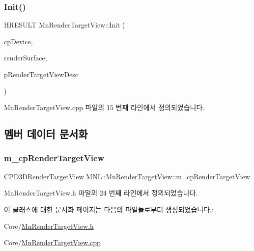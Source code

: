 \subsubsection{\texorpdfstring{Init()}{Init()}}
{\footnotesize\ttfamily H\+R\+E\+S\+U\+LT Mn\+Render\+Target\+View\+::\+Init (\begin{DoxyParamCaption}\item[{const \hyperlink{namespace_m_n_l_a1eec210db8f309a4a9ac0d9658784c31}{C\+P\+D3\+D\+Device}}]{cp\+Device,  }\item[{const \hyperlink{namespace_m_n_l_addb538e1cbd1f443e6db5e6312487c51}{C\+P\+D3\+D\+Texture2D}}]{render\+Surface,  }\item[{const std\+::shared\+\_\+ptr$<$ D3\+D11\+\_\+\+R\+E\+N\+D\+E\+R\+\_\+\+T\+A\+R\+G\+E\+T\+\_\+\+V\+I\+E\+W\+\_\+\+D\+E\+SC $>$}]{p\+Render\+Target\+View\+Desc }\end{DoxyParamCaption})}



Mn\+Render\+Target\+View.\+cpp 파일의 15 번째 라인에서 정의되었습니다.



\subsection{멤버 데이터 문서화}
\mbox{\label{class_m_n_l_1_1_mn_render_target_view_ab9446c83ebcb3bd16d6ae02cd2692a11}} 
\subsubsection{\texorpdfstring{m\+\_\+cp\+Render\+Target\+View}{m\_cpRenderTargetView}}
{\footnotesize\ttfamily \hyperlink{namespace_m_n_l_aa08a7c0b5ac9d877dacb57b9306b7b8c}{C\+P\+D3\+D\+Render\+Target\+View} M\+N\+L\+::\+Mn\+Render\+Target\+View\+::m\+\_\+cp\+Render\+Target\+View\hspace{0.3cm}{\ttfamily [private]}}



Mn\+Render\+Target\+View.\+h 파일의 24 번째 라인에서 정의되었습니다.



이 클래스에 대한 문서화 페이지는 다음의 파일들로부터 생성되었습니다.\+:\begin{DoxyCompactItemize}
\item 
Core/\hyperlink{_mn_render_target_view_8h}{Mn\+Render\+Target\+View.\+h}\item 
Core/\hyperlink{_mn_render_target_view_8cpp}{Mn\+Render\+Target\+View.\+cpp}\end{DoxyCompactItemize}
